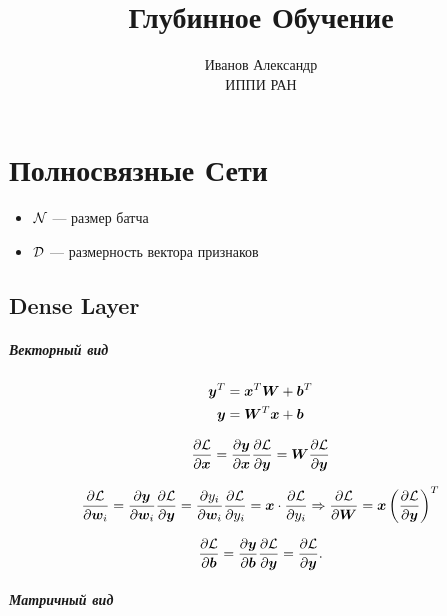 \documentclass{report}
\numberwithin{theorem}{chapter}
\numberwithin{statement}{chapter}
\numberwithin{lemma}{chapter}
\theoremstyle{definition}
\numberwithin{task}{chapter}
\theoremstyle{remark}
\numberwithin{example}{chapter}
\theoremstyle{definition}
\numberwithin{definition}{chapter}
\theoremstyle{remark}
\theoremstyle{remark}
\numberwithin{lyrics}{section}
\begin{document}
\title{Глубинное Обучение}
\author{Иванов Александр \\ ИППИ РАН}
\date{}
\maketitle
\tableofcontents
	


\chapter{Полносвязные Сети}

\begin{itemize}
	\item $\mathcal{N}$ --- размер батча
	\item $\mathcal{D}$ --- размерность вектора признаков
\end{itemize}

\section{Dense Layer}

\paragraph{Векторный вид}

\begin{gather}
\boldsymbol{y}^T = \boldsymbol{x}^T \boldsymbol{W} + \boldsymbol{b}^T \\
\boldsymbol{y} = \boldsymbol{W}^T \boldsymbol{x} + \boldsymbol{b}
\end{gather}

\begin{gather}
\frac{\partial \mathcal{L} }{\partial \boldsymbol{x}} = \frac{\partial \boldsymbol{y} }{\partial \boldsymbol{x}} \frac{\partial \mathcal{L} }{\partial \boldsymbol{y}} = \boldsymbol{W} \frac{\partial \mathcal{L} }{\partial \boldsymbol{y}}
\end{gather}

\begin{gather*}
\frac{\partial \mathcal{L} }{\partial \boldsymbol{w}_i} = \frac{\partial \boldsymbol{y} }{\partial \boldsymbol{w}_i} \frac{\partial \mathcal{L} }{\partial \boldsymbol{y}} = \frac{\partial y_i }{\partial \boldsymbol{w}_i} \frac{\partial \mathcal{L} }{\partial y_i} = \boldsymbol{x} \cdot \frac{\partial \mathcal{L} }{\partial y_i} \Rightarrow \frac{\partial \mathcal{L} }{\partial \boldsymbol{W}} = \boldsymbol{x} \left(\frac{\partial \mathcal{L} }{\partial \boldsymbol{y}}\right)^T
\end{gather*}

\begin{gather*}
\frac{\partial \mathcal{L} }{\partial \boldsymbol{b}} = \frac{\partial \boldsymbol{y} }{\partial \boldsymbol{b}} \frac{\partial \mathcal{L} }{\partial \boldsymbol{y}} = \frac{\partial \mathcal{L} }{\partial \boldsymbol{y}}.
\end{gather*}


\paragraph{Матричный вид}
\end{document}
